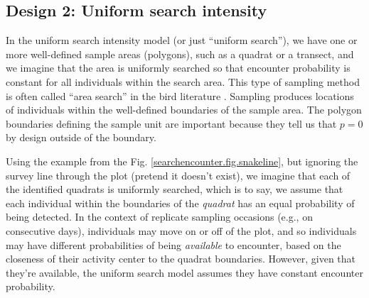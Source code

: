 \subsection{Design 2: Uniform search intensity}

In the uniform search intensity model (or just ``uniform search''), we
have one or more well-defined sample areas (polygons), such as a
quadrat or a transect, and we imagine that the area is uniformly
searched so that encounter probability is constant for all individuals
within the search area.  This type of sampling method is often called
``area search'' in the bird literature \citep{bibby_etal:1992}.
Sampling produces locations of individuals within the well-defined
boundaries of the sample area. The polygon boundaries defining the
sample unit are important because they tell us that $p=0$ by design
outside of the boundary.

Using the example from the Fig. \ref{searchencounter.fig.snakeline},
but ignoring the survey line through the plot (pretend it doesn't
exist), 
we imagine that each of the identified quadrats is uniformly searched,
which is to say, we assume that
 each individual within the boundaries of the {\it quadrat}
has an equal probability of being detected.  In the context of
replicate sampling occasions (e.g., on consecutive days), individuals
may move on or off of the plot, and so individuals may have different
probabilities of being {\it available} to encounter, based on the
closeness of their activity center to the quadrat boundaries. However, given
that they're available, the uniform search model assumes they have constant
encounter probability.
%
%

